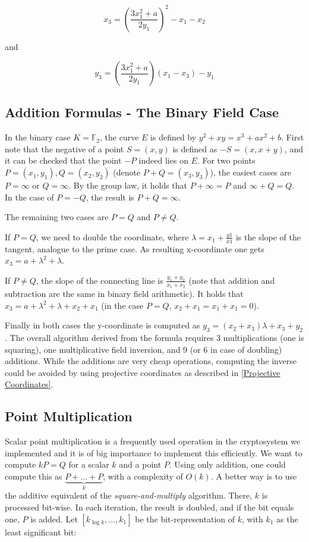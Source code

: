 \documentclass[11pt,english]{article}
\begin{document}
$$x_3=\left(\frac{3x_1^2+a}{2y_1}\right)^2-x_1-x_2$$

and

$$y_3=\left(\frac{3x_1^2+a}{2y_1}\right)(x_1-x_3)-y_1$$

\subsection{Addition Formulas - The Binary Field Case}
In the binary case $K=\mathbb{F}_2$, the curve $E$ is defined by $y^2+xy=x^3+ax^2+b$. First note that the negative of a point $S=(x,y)$ is defined as $-S=(x,x+y)$, and it can be checked that the point $-P$ indeed lies on $E$.
For two points $P=(x_1,y_1),Q=(x_2,y_2)$ (denote $P+Q=(x_3,y_3)$), the easiest cases are $P=\infty$ or $Q=\infty$. By the group law, it holds that $P+\infty=P$ and $\infty+Q=Q$. In the case of $P=-Q$, the result is $P+Q=\infty$.

The remaining two cases are $P=Q$ and $P\ne Q$.

If $P=Q$, we need to double the coordinate, where $\lambda=x_1+\frac{y1}{x1}$ is the slope of the tangent, analogue to the prime case. As resulting x-coordinate one gets $x_3=a+\lambda^2+\lambda$.

If $P\ne Q$, the slope of the connecting line is $\frac{y_1+y_2}{x_1+x_2}$ (note that addition and subtraction are the same in binary field arithmetic). It holds that $x_3=a+\lambda^2+\lambda+x_2+x_1$ (in the case $P=Q$, $x_2+x_1=x_1+x_1=0$).

Finally in both cases the y-coordinate is computed as $y_3=(x_2+x_3)\lambda+x_3+y_2$. The overall algorithm derived from the formula requires 3 multiplications (one is squaring), one multiplicative field inversion, and 9 (or 6 in case of doubling) additions. While the additions are very cheap operations, computing the inverse could be avoided by using projective coordinates as described in \ref{Projective Coordinates}.

\subsection{Point Multiplication}
Scalar point multiplication is a frequently used operation in the cryptosystem we implemented and it is of big importance to implement this efficiently. We want to compute $kP=Q$ for a scalar $k$ and a point $P$. Using only addition, one could compute this as $\underbrace{P+...+P}_{k}$, with a complexity of $O(k)$. A better way is to use the additive equivalent of the \emph{square-and-multiply} algorithm. There, $k$ is processed bit-wise. In each iteration, the result is doubled, and if the bit equals one, $P$ is added. Let $[k_{\log{k}},...,k_1]$ be the bit-representation of $k$, with $k_1$ as the least significant bit:
\end{document}
